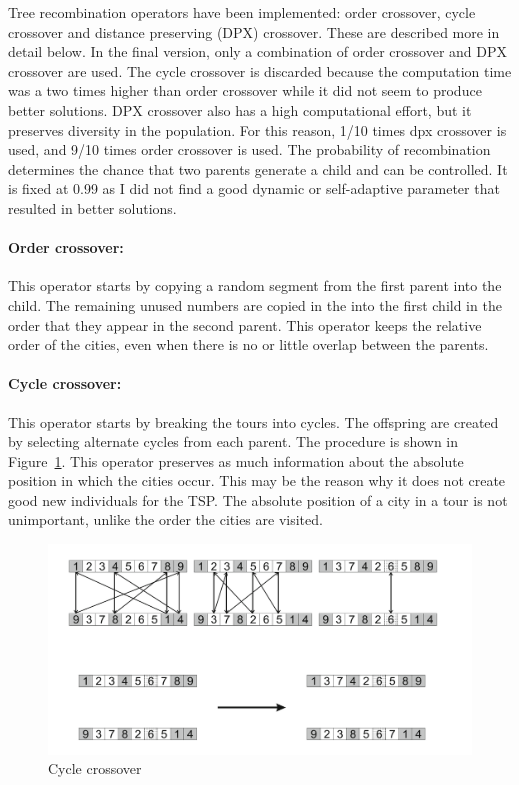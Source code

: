 \documentclass[a4paper,10pt]{article}
\begin{document}
Tree recombination operators have been implemented: order crossover, cycle crossover and distance preserving (DPX) crossover. These are described more in detail below. In the final version, only a combination of order crossover and DPX crossover are used. The cycle crossover is discarded because the computation time was a two times higher than order crossover while it did not seem to produce better solutions. DPX crossover also has a high computational effort, but it preserves diversity in the population. For this reason, 1/10 times dpx crossover is used, and 9/10 times order crossover is used. The probability of recombination determines the chance that two parents generate a child and can be controlled. It is fixed at 0.99 as I did not find a good dynamic or self-adaptive parameter that resulted in better solutions. 
\paragraph{Order crossover:} This operator starts by copying a random segment from the first parent into the child. The remaining unused numbers are copied in the into the first child in the order that they appear in the second parent. This operator keeps the relative order of the cities, even when there is no or little overlap between the parents.                                              
\paragraph{Cycle crossover:} This operator starts by breaking the tours into cycles. The offspring are created by selecting alternate cycles from each parent. The procedure is shown in Figure~\ref{fig:cyclecrossover}. This operator preserves as much information about the absolute position in which the cities occur. This may be the reason why it does not create good new individuals for the TSP. The absolute position of a city in a tour is not unimportant, unlike the order the cities are visited. 
\begin{figure}[H]
  \centering
  \includegraphics[width=.6\textwidth]{img/cyclecrossover.png}
  \caption{Cycle crossover \cite{EibenA.E2015ItEC}}
  \label{fig:cyclecrossover}
\end{figure}
\end{document}
